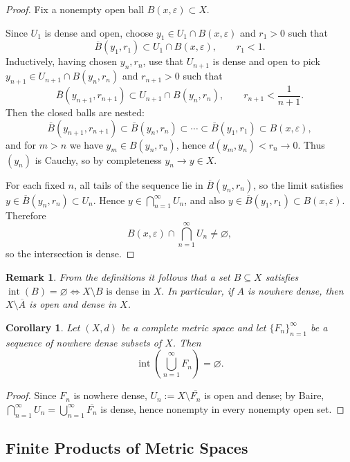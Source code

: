 \documentclass[12pt]{article}
\newtheorem{corollary}{Corollary}
\newtheorem{remark}{Remark}
\begin{document}
\begin{proof}
Fix a nonempty open ball $B(x,\varepsilon)\subset X$.

Since $U_1$ is dense and open, choose $y_1\in U_1\cap B(x,\varepsilon)$ and $r_1>0$ such that
\[
\overline{B}(y_1,r_1)\subset U_1\cap B(x,\varepsilon),\qquad r_1<1.
\]
Inductively, having chosen $y_n,r_n$, use that $U_{n+1}$ is dense and open to pick
$y_{n+1}\in U_{n+1}\cap B(y_n,r_n)$ and $r_{n+1}>0$ such that
\[
\overline{B}(y_{n+1},r_{n+1})\subset U_{n+1}\cap B(y_n,r_n),\qquad r_{n+1}<\frac1{n+1}.
\]
Then the closed balls are nested:
\[
\overline{B}(y_{n+1},r_{n+1})\subset \overline{B}(y_n,r_n)\subset \cdots \subset \overline{B}(y_1,r_1)\subset B(x,\varepsilon),
\]
and for $m>n$ we have $y_m\in B(y_n,r_n)$, hence $d(y_m,y_n)<r_n\to 0$. Thus $(y_n)$ is Cauchy, so by completeness $y_n\to y\in X$.

For each fixed $n$, all tails of the sequence lie in $\overline{B}(y_n,r_n)$, so the limit satisfies
$y\in \overline{B}(y_n,r_n)\subset U_n$. Hence $y\in \bigcap_{n=1}^\infty U_n$, and also
$y\in \overline{B}(y_1,r_1)\subset B(x,\varepsilon)$. Therefore
\[
B(x,\varepsilon)\cap\bigcap_{n=1}^\infty U_n\neq\varnothing,
\]
so the intersection is dense.
\end{proof}


\begin{remark}
From the definitions it follows that a set $B \subseteq X$ satisfies 
\(\operatorname{int}(B)=\varnothing \Longleftrightarrow X\setminus B \text{ is dense in } X.\)
In particular, if $A$ is nowhere dense, then
\( X\setminus \overline{A}\) 
is open and dense in $X$.
\end{remark}

\begin{corollary}
Let $(X,d)$ be a complete metric space and let $\{F_n\}_{n=1}^{\infty}$ be a sequence of nowhere dense subsets of $X$. Then
\[
\operatorname{int}\!\left(\bigcup_{n=1}^{\infty} F_n\right)=\varnothing.
\]
\end{corollary}

\begin{proof}
Since $F_n$ is nowhere dense, $U_n:=X\setminus\overline{F_n}$ is open and dense; by Baire, $\bigcap_{n=1}^\infty U_n = \bigcup_{n=1}^\infty \overline{F_n}$ is dense, hence nonempty in every nonempty open set.
\end{proof}

\subsection*{Finite Products of Metric Spaces}
\end{document}
